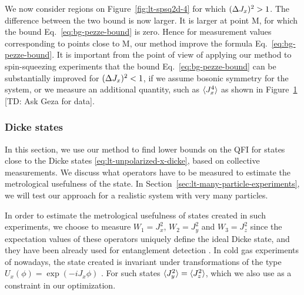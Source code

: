 We now consider regions on Figure~\ref{fig:lt-spsq2d-4} for which $(\Delta J_x )^2>1$.
The difference between the two bound is now larger.
It is larger at point M, for which the bound Eq.~\eqref{eq:bg-pezze-bound} is zero.
Hence for measurement values corresponding to points close to M, our method improve the formula Eq.~\eqref{eq:bg-pezze-bound}.
It is important from the point of view of applying our method to spin-squeezing experiments that the bound Eq.~\eqref{eq:bg-pezze-bound} can be substantially improved for $(\Delta J_x )^2<1$, if we assume bosonic symmetry for the system, or we measure an additional quantity, such as $\langle{J_x^4}\rangle$ as shown in Figure~\ref{fig:lt-adding-jx4-to-the-bound} [TD: Ask Geza for data].
\begin{figure}[htp]
  \centering
  \label{fig:lt-adding-jx4-to-the-bound}
\end{figure}


\subsubsection{Dicke states}
\label{sec:lt-bound-dicke-states}

In this section, we use our method to find lower bounds on the QFI for states close to the Dicke states \eqref{eq:lt-unpolarized-x-dicke}, based on collective measurements.
We discuss what operators have to be measured to estimate the metrological usefulness of the state.
In Section~\ref{sec:lt-many-particle-experiments}, we will test our approach for a realistic system with very many particles.

In order to estimate the metrological usefulness of states created in such experiments, we choose to measure $W_1=J_x^2$, $W_2=J_y^2$ and $W_3=J_z^2$ since the expectation values of these operators uniquely define the ideal Dicke state, and they have been already used for entanglement detection \cite{Luecke2014}.
In cold gas experiments of nowadays, the state created is invariant under transformations of the type $U_{x}(\phi)=\exp(-i J_x \phi)$ \cite{Apellaniz2015}.
For such states $\langle{J_y^2}\rangle=\langle{J_z^2}\rangle$, which we also use as a constraint in our optimization.

